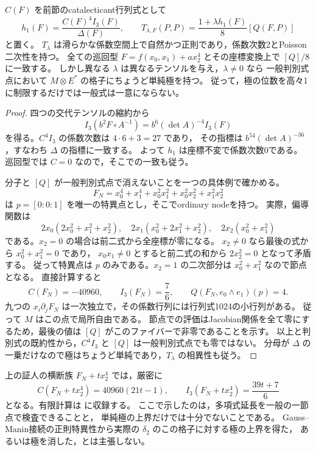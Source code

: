 \begin{proposition}[一節点境界で単純極を持つ自然な補正]
\label{prop:ku-simple-pole-ambiguity}
$C(F)$ を前節のcatalecticant行列式として
\[
 h_1(F)=\frac{C(F)^4I_3(F)}{\Delta(F)},\qquad
 T_{\lambda,F}(P,P)=\frac{1+\lambda h_1(F)}8[Q(F,P)]
\]
と置く。
$T_\lambda$ は滑らかな係数空間上で自然かつ正則であり，係数次数2とPoisson二次性を持つ。
全ての巡回型 $F=f(x_0,x_1)+a x_2^4$ とその座標変換上で $[Q]/8$ に一致する。
しかし異なる $\lambda$ は異なるテンソルを与え，$\lambda\ne0$ なら
一般判別式点において $M\otimes E^*$ の格子にちょうど単純極を持つ。
従って，極の位数を高々1に制限するだけでは一般式は一意にならない。
\end{proposition}
\begin{proof}
四つの交代テンソルの縮約から
\[
 I_3(b^2F\circ A^{-1})=b^6(\det A)^{-4}I_3(F)
\]
を得る。$C^4I_3$ の係数次数は $4\cdot6+3=27$ であり，
その指標は $b^{54}(\det A)^{-36}$，すなわち $\Delta$ の指標に一致する。
よって $h_1$ は座標不変で係数次数0である。
巡回型では $C=0$ なので，そこでの一致も従う。

分子と $[Q]$ が一般判別式点で消えないことを一つの具体例で確かめる。
\begin{equation}\label{eq:ku-nodal-quartic-witness}
 F_N=x_0^4+x_1^4+x_0^2x_1^2+x_0^2x_2^2+x_1^2x_2^2
\end{equation}
は $p=[0:0:1]$ を唯一の特異点とし，そこでordinary nodeを持つ。
実際，偏導関数は
\[
 2x_0(2x_0^2+x_1^2+x_2^2),\quad
 2x_1(x_0^2+2x_1^2+x_2^2),\quad
 2x_2(x_0^2+x_1^2)
\]
である。$x_2=0$ の場合は前二式から全座標が零になる。
$x_2\ne0$ なら最後の式から $x_0^2+x_1^2=0$ であり，
$x_0x_1\ne0$ とすると前二式の和から $2x_2^2=0$ となって矛盾する。
従って特異点は $p$ のみである。$x_2=1$ の二次部分は $x_0^2+x_1^2$ なので節点となる。
直接計算すると
\[
 C(F_N)=-40960,\qquad I_3(F_N)=\frac76,
 \qquad Q(F_N,e_0\wedge e_1)(p)=4.
\]
九つの $x_i\partial_jF_N$ は一次独立で，その係数行列には行列式1024の小行列がある。
従って $M$ はこの点で局所自由である。
節点での評価はJacobian関係を全て零にするため，最後の値は $[Q]$ がこのファイバーで非零であることを示す。
以上と判別式の既約性から，$C^4I_3$ と $[Q]$ は一般判別式点でも零ではない。
分母が $\Delta$ の一乗だけなので極はちょうど単純であり，$T_\lambda$ の相異性も従う。
\end{proof}

上の証人の横断族 $F_N+t x_2^4$ では，厳密に
\[
 C(F_N+t x_2^4)=40960(21t-1),\qquad
 I_3(F_N+t x_2^4)=\frac{39t+7}{6}
\]
となる。有限計算は  に収録する。
ここで示したのは，多項式延長を一般の一節点で検査できることと，
単純極の上界だけでは十分でないことである。
Gauss--Manin接続の正則特異性から実際の $\delta_2$ のこの格子に対する極の上界を得た，
あるいは極を消した，とは主張しない。
